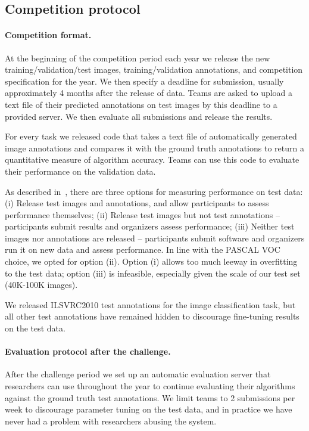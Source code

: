 \begin{appendices}

\section{Competition protocol}
\label{sec:AppCompetition}


\paragraph{Competition format.} 
At the beginning of the competition period each year we release the new training/validation/test images, training/validation annotations, and competition
specification for the year. We then specify a deadline for submission, usually approximately 4 months after the release of data. Teams are asked to upload
a text file of their predicted annotations on test images by this deadline to a provided server. We then evaluate all submissions and release the results.

For every task we released code that takes a text file of automatically generated image annotations and compares it with
the ground truth annotations to return a quantitative measure of algorithm accuracy. Teams can use this code to evaluate
their performance on the validation data.

As described in~\citep{PASCALIJCV2}, 
there are three options for measuring performance on test data: (i) Release test images and annotations, and allow participants to assess
performance themselves; (ii) Release test images but not test annotations -- participants submit results and organizers assess performance; (iii) Neither
test images nor annotations are released -- participants submit software and organizers run it on new data and assess performance. In line with the 
PASCAL VOC choice, we opted for option (ii). Option (i) allows too much leeway in overfitting to the test data; option (iii) is infeasible, especially given
the scale of our test set (40K-100K images).

We released ILSVRC2010 test annotations for the image classification task, but all other test annotations have remained hidden to discourage
fine-tuning results on the test data.

\paragraph{Evaluation protocol after the challenge.} 

After the challenge period we set up an automatic evaluation server that researchers can use throughout the year to continue evaluating their algorithms
against the ground truth test annotations. We limit teams to 2 submissions per week to discourage parameter tuning on the test data, and in practice
we have never had a problem with researchers abusing the system.






\end{appendices}